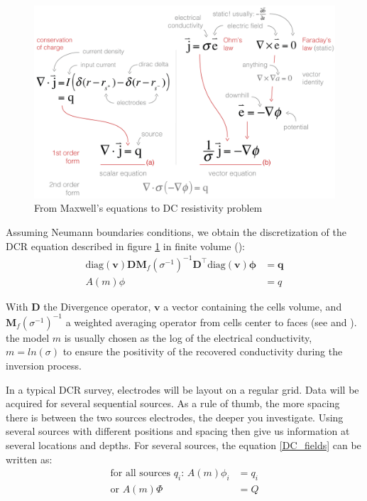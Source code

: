 \documentclass[twoside]{article}
\begin{document}
\begin{figure}[!ht]
\centering
\includegraphics[width=.55\linewidth]{figures/DCEquations.png}
\caption{From Maxwell's equations to DC resistivity problem}
\label{DCequations}
\end{figure}

Assuming Neumann boundaries conditions, we obtain the discretization of the DCR equation described in figure \ref{DCequations} in finite volume (\cite{CHO:2016}): 
\begin{align}
\text{diag}(\mathbf{v}) \mathbf{D} \mathbf{M}_f(\sigma^{-1})^{-1} \mathbf{D}^\top \text{diag}(\mathbf{v}) \boldsymbol{\phi} &= \mathbf{q} \\
A(m) \phi &= q \label{DC_fields}
\end{align}

With $\mathbf{D}$ the Divergence operator, $\mathbf{v}$ a vector containing the cells volume, and $\mathbf{M}_f(\sigma^{-1})^{-1}$ a weighted averaging operator from cells center to faces (see \cite{CHO:2016} and \cite{Haber:2014}). the model $m$ is usually chosen as the log of the electrical conductivity, $m = ln(\sigma)$ to ensure the positivity of the recovered conductivity during the inversion process.

In a typical DCR survey, electrodes will be layout on a regular grid. Data will be acquired for several sequential sources. As a rule of thumb, the more spacing there is between the two sources electrodes, the deeper you investigate. Using several sources with different positions and spacing then give us information at several locations and depths.
For several sources, the equation \ref{DC_fields} can be written as:
\begin{align}
\text{for all sources $q_i$: } A(m) \phi_i &= q_i \\
\text{or }A(m)\Phi &= Q \label{DC_SimSrcs}
\end{align}
\end{document}
